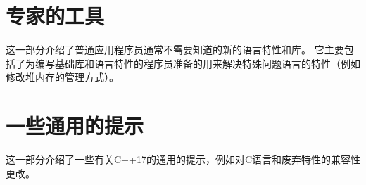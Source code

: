 \documentclass[twoside,10pt,AutoFakeBold,AutoFakeSlant]{book}
\begin{document}
\begin{sloppypar}
    \part{专家的工具}\label{part5}
    这一部分介绍了普通应用程序员通常不需要知道的新的语言特性和库。
    它主要包括了为编写基础库和语言特性的程序员准备的用来解决特殊问题语言的特性（例如修改堆内存的管理方式）。

    
    
    
    
    


    \part{一些通用的提示}\label{part6}
    这一部分介绍了一些有关C++17的通用的提示，例如对C语言和废弃特性的兼容性更改。
    
    

    \backmatter
  \end{sloppypar}
\end{document}
